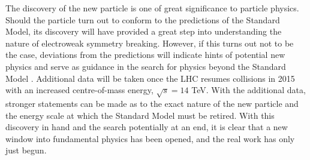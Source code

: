 The discovery of the new particle is one of great significance to particle physics.
Should the particle turn out to conform to the predictions of the Standard Model, 
its discovery will have provided a great step into understanding the nature of 
electroweak symmetry breaking. However, if this turns out not to be the case, 
deviations from the predictions will indicate hints of potential new physics
and serve as guidance in the search for physics beyond the Standard Model . 
Additional data will be taken once the LHC resumes 
collisions in 2015 with an increased centre-of-mass energy, $\sqrt{s}=14$ TeV. 
With the additional data, stronger statements can be made as to 
the exact nature of the new particle and the energy scale at which the Standard Model 
must be retired. With this discovery in hand and the search potentially at an end, 
it is clear that a new window into fundamental physics has been opened, and the real 
work has only just begun.




